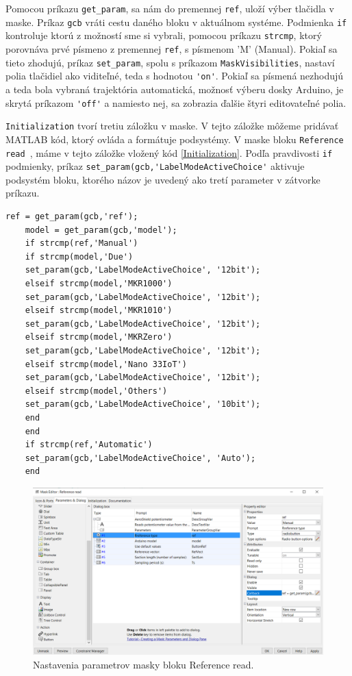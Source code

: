 Pomocou príkazu \verb|get_param|, sa nám do premennej \verb|ref|, uloží výber tlačidla v maske. Príkaz \verb|gcb| vráti cestu
daného bloku v aktuálnom systéme. Podmienka \verb|if| kontroluje ktorú z možností sme si vybrali, pomocou príkazu \verb|strcmp|, ktorý porovnáva prvé písmeno z premennej \verb|ref|, s písmenom 'M' (Manual). Pokiaľ sa tieto zhodujú, príkaz \verb|set_param|, spolu s príkazom \verb|MaskVisibilities|, nastaví polia tlačidiel ako viditeľné, teda s hodnotou \verb|'on'|. Pokiaľ sa písmená nezhodujú a teda bola vybraná trajektória automatická, možnosť výberu dosky Arduino, je skrytá príkazom \verb|'off'| a namiesto nej, sa zobrazia ďalšie štyri editovateľné polia. 

\verb|Initialization| tvorí tretiu záložku v maske. V tejto záložke môžeme pridávať MATLAB kód, ktorý ovláda a formátuje podsystémy. V maske bloku \verb|Reference read |, máme v tejto záložke vložený kód \ref{Initialization}. Podľa pravdivosti \verb|if| podmienky, príkaz \newline \verb|set_param(gcb,'LabelModeActiveChoice'| aktivuje podsystém bloku, ktorého názov je uvedený ako tretí parameter v zátvorke príkazu. 

\begin{lstlisting}[caption={Initialization- maska Reference read.},captionpos=b,label=Initialization]
	ref = get_param(gcb,'ref');
	model = get_param(gcb,'model');
	if strcmp(ref,'Manual')
	if strcmp(model,'Due')
	set_param(gcb,'LabelModeActiveChoice', '12bit');
	elseif strcmp(model,'MKR1000')
	set_param(gcb,'LabelModeActiveChoice', '12bit');
	elseif strcmp(model,'MKR1010')
	set_param(gcb,'LabelModeActiveChoice', '12bit');
	elseif strcmp(model,'MKRZero')
	set_param(gcb,'LabelModeActiveChoice', '12bit');
	elseif strcmp(model,'Nano 33IoT')
	set_param(gcb,'LabelModeActiveChoice', '12bit');
	elseif strcmp(model,'Others') 
	set_param(gcb,'LabelModeActiveChoice', '10bit');
	end
	end
	if strcmp(ref,'Automatic')
	set_param(gcb,'LabelModeActiveChoice', 'Auto');
	end
\end{lstlisting}


\begin{figure}[!tbh]
	\centering
	\includegraphics[width=\textwidth]{obr/ParamAnd.png}
	\caption{Nastavenia parametrov masky bloku Reference read.}\label{OBRAZOK 2.6.101}
\end{figure}


